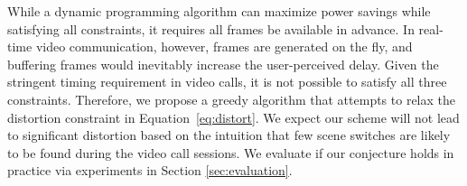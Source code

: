 %
%


While a dynamic programming algorithm can maximize power savings while satisfying all constraints, 
it requires all frames be available in advance. 
In real-time video communication, however, frames are generated on the fly, 
and buffering frames would inevitably increase the user-perceived delay. 
Given the stringent timing requirement in video calls, 
it is not possible to satisfy all three constraints.
Therefore, we propose a greedy algorithm that attempts to relax the distortion constraint
in Equation~\ref{eq:distort}. We expect our scheme will not lead to significant
distortion based on the intuition that few scene switches are
likely to be found during the video call sessions. 
We evaluate if
our conjecture holds in practice via experiments in Section \ref{sec:evaluation}. 


